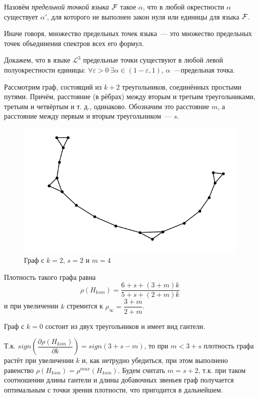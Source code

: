 \Def Назовём \textit{предельной точкой языка $\mathcal{F}$} такое $\alpha$, что в любой окрестности $\alpha$ существует $\alpha'$, для которого не выполнен закон нуля или единицы для языка $\mathcal{F}$.

Иначе говоря, множество предельных точек языка~--- это множество предельных точек объединения спектров всех его формул.

Докажем, что в языке $\mathcal{L}^3$ предельные точки существуют в любой левой полуокрестности единицы: 
$\forall \varepsilon > 0 ~ \exists \alpha \in (1 - \varepsilon, 1)$, $\alpha$~---предельная точка.

Рассмотрим граф, состоящий из $k+2$ треугольников, соединённых простыми путями.
Причём, расстояние (в рёбрах) между вторым и третьим треугольниками, третьим и четвёртым и т. д., одинаково.
Обозначим это расстояние $m$, а расстояние между первым и вторым треугольником~--- $s$.

\begin{figure}[h]
    \centering
  \includegraphics[scale=0.4]{picrel/Hksm.png}
  \caption{Граф с $k = 2$, $s = 2$ и $m = 4$}
  \label{fig:chain1}
\end{figure}

Плотность такого графа равна 
$$\rho({H_{ksm}}) = \dfrac{6+s + (3+m)k}{5+s + (2+m)k}$$
и при увеличении $k$ стремится к $\rho_\infty = \dfrac{3+m}{2+m}$.

Граф с $k=0$ состоит из двух треугольников и имеет вид гантели.

Т.к. 
$sign\left(\dfrac{\partial\rho({H_{ksm}})}{\partial k}\right) = sign(3+s-m)$,
то при $m < 3 + s$ плотность графа растёт при увеличении  $k$ и, как нетрудно убедиться, при этом выполнено равенство
$\rho({H_{ksm}}) = \rho^{max}({H_{ksm}})$.
Будем считать $m = s+2$, т.к. при таком соотношении длины гантели и длины добавочных звеньев
граф получается оптимальным с точки зрения плотности, что пригодится в дальнейшем.

